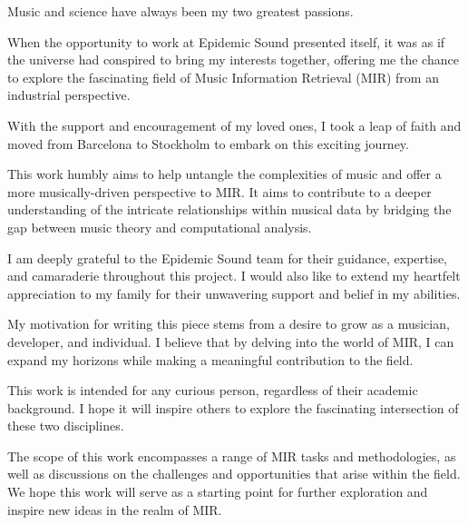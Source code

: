 \begin{preface}

Music and science have always been my two greatest passions. 

When the opportunity to work at Epidemic Sound presented itself, it was as if the universe had conspired to bring my interests together, offering me the chance to explore the fascinating field of Music Information Retrieval (MIR) from an industrial perspective. 

With the support and encouragement of my loved ones, I took a leap of faith and moved from Barcelona to Stockholm to embark on this exciting journey.

This work humbly aims to help untangle the complexities of music and offer a more musically-driven perspective to MIR. It aims to contribute to a deeper understanding of the intricate relationships within musical data by bridging the gap between music theory and computational analysis.

I am deeply grateful to the Epidemic Sound team for their guidance, expertise, and camaraderie throughout this project. I would also like to extend my heartfelt appreciation to my family for their unwavering support and belief in my abilities.

My motivation for writing this piece stems from a desire to grow as a musician, developer, and individual. I believe that by delving into the world of MIR, I can expand my horizons while making a meaningful contribution to the field.

This work is intended for any curious person, regardless of their academic background. I hope it will inspire others to explore the fascinating intersection of these two disciplines.

The scope of this work encompasses a range of MIR tasks and methodologies, as well as discussions on the challenges and opportunities that arise within the field. We hope this work will serve as a starting point for further exploration and inspire new ideas in the realm of MIR.

\newpage
\end{preface}